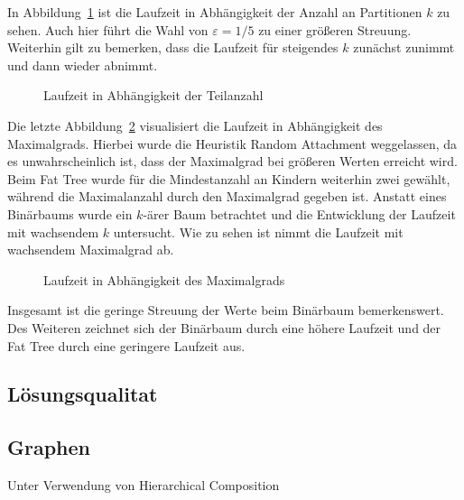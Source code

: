 In Abbildung~\ref{fig:runkparts} ist die Laufzeit in Abhängigkeit der Anzahl an Partitionen $k$ zu sehen.
Auch hier führt die Wahl von $\varepsilon=1/5$ zu einer größeren Streuung.
Weiterhin gilt zu bemerken, dass die Laufzeit für steigendes $k$ zunächst zunimmt und dann wieder abnimmt.
\begin{figure}
    \centering
    \scalebox{0.8}{}
    \caption{Laufzeit in Abhängigkeit der Teilanzahl}\label{fig:runkparts}
\end{figure}

Die letzte Abbildung~\ref{fig:rundeg} visualisiert die Laufzeit in Abhängigkeit des Maximalgrads.
Hierbei wurde die Heuristik Random Attachment weggelassen, da es unwahrscheinlich ist, dass der Maximalgrad bei größeren Werten erreicht wird.
Beim Fat Tree wurde für die Mindestanzahl an Kindern weiterhin zwei gewählt, während die Maximalanzahl durch den Maximalgrad gegeben ist.
Anstatt eines Binärbaums wurde ein $k$\hyp ärer Baum betrachtet und die Entwicklung der Laufzeit mit wachsendem $k$ untersucht.
Wie zu sehen ist nimmt die Laufzeit mit wachsendem Maximalgrad ab.
\begin{figure}
    \centering
    \scalebox{0.8}{}
    \caption{Laufzeit in Abhängigkeit des Maximalgrads}\label{fig:rundeg}
\end{figure}

Insgesamt ist die geringe Streuung der Werte beim Binärbaum bemerkenswert.
Des Weiteren zeichnet sich der Binärbaum durch eine höhere Laufzeit und der Fat Tree durch eine geringere Laufzeit aus.

\subsection{Lösungsqualitat}
\subsection{Graphen}
Unter Verwendung von Hierarchical Composition

